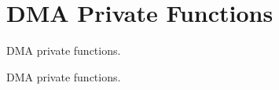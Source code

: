 \hypertarget{group___d_m_a___private___functions}{}\section{D\+MA Private Functions}
\label{group___d_m_a___private___functions}


D\+MA private functions.  


D\+MA private functions. 

